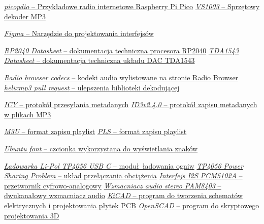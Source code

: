 \documentclass[12pt]{report}
\begin{document}
\begin{thebibliography}{9}
		\href{https://github.com/episource/picopdio}{\textit{picopdio} -- Przykładowe radio internetowe Raspberry Pi Pico}
		\href{https://botland.com.pl/odtwarzacze-mp3-wav-ogg-midi/14308-odtwarzacz-mp3-vs1003-z-mikrofonem-5903351241786.html}{\textit{VS1003} -- Sprzętowy dekoder MP3}
		
		\href{https://www.figma.com}{\textit{Figma} -- Narzędzie do projektowania interfejsów}
		
		\href{https://datasheets.raspberrypi.com/rp2040/rp2040-datasheet.pdf}{\textit{RP2040 Datasheet} -- dokumentacja techniczna procesora RP2040}
		\href{http://www.lampizator.eu/lampizator/LINKS%20AND%20DOWNLOADS/DATAMINING/tda%201543.pdf}{\textit{TDA1543 Datasheet} -- dokumentacja techniczna układu DAC TDA1543}
		
		\href{https://www.radio-browser.info/codecs}{\textit{Radio browser codecs} -- kodeki audio wylistowane na stronie Radio Browser}
		\href{https://github.com/ultraembedded/libhelix-mp3/pull/3}{\textit{helixmp3 pull request} -- ulepszenia biblioteki dekodującej}
		
		\href{https://gist.github.com/niko/2a1d7b2d109ebe7f7ca2f860c3505ef0#file-icy_meta-md}{\textit{ICY} -- protokół przesyłania metadanych}
		\href{https://mutagen-specs.readthedocs.io/en/latest/id3/id3v2.4.0-structure.html}{\textit{ID3v2.4.0} -- protokół zapisu metadanych w plikach MP3}
		
		\href{https://en.wikipedia.org/wiki/M3U}{\textit{M3U} -- format zapisu playlist}
		\href{https://en.wikipedia.org/wiki/PLS_(file_format)}{\textit{PLS} -- format zapisu playlist}
		
		\href{https://design.ubuntu.com/font}{\textit{Ubuntu font} -- czcionka wykorzystana do wyświetlania znaków}
		
		\href{https://botland.com.pl/moduly-ladowania-lipol-usb-micro-usb/16979-ladowarka-li-pol-tp4056-pojedyncza-cela-1s-37v-usb-typ-c-z-zabezpieczeniami--5904422326708.html}{\textit{Ładowarka Li-Pol TP4056 USB C} -- moduł ładowania ogniw}
		\href{https://www.best-microcontroller-projects.com/tp4056-page2.html}{\textit{TP4056 Power Sharing Problem} -- układ przełączania obciążenia}
		\href{https://www.aliexpress.com/item/1005002846127078.html}{\textit{Interfejs I2S PCM5102A} -- przetwornik cyfrowo-analogowy}
		\href{https://botland.com.pl/odtwarzacze-mp3-wav-ogg-midi/6641-wzmacniacz-audio-stereo-pam8403-5v-3w-dwukanalowy-zielony-5904422359850.html}{\textit{Wzmacniacz audio stereo PAM8403} -- dwukanałowy wzmacniacz audio}
		\href{https://www.kicad.org/}{\textit{KiCAD} -- program do tworzenia schematów elektrycznych i projektowania płytek PCB}
		\href{https://openscad.org/}{\textit{OpenSCAD} -- program do skryptowego projektowania 3D}
		

\end{thebibliography}
\end{document}

